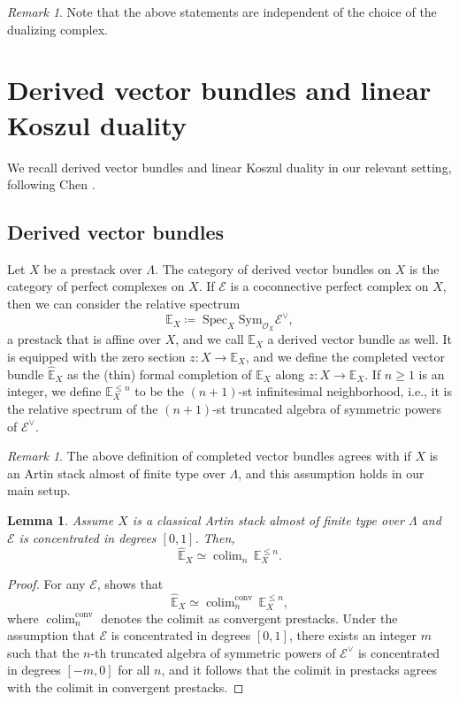 \documentclass{amsart}
\newtheorem{lemma}[theorem]{Lemma}
\theoremstyle{definition}
\theoremstyle{remark}
\newtheorem{remark}[theorem]{Remark}
\numberwithin{equation}{section}
\DeclareMathOperator{\Spec}{Spec}
\DeclareMathOperator{\colim}{colim}
\begin{document}
\begin{remark}
Note that the above statements are independent of the choice of the dualizing complex. 
\end{remark}

\section{Derived vector bundles and linear Koszul duality}

We recall derived vector bundles and linear Koszul duality in our relevant setting, following Chen \cite{Chen2023categorical}. 

\subsection{Derived vector bundles}
Let $X$ be a prestack over $\Lambda$. The category of derived vector bundles on $X$ is the category of perfect complexes on $X$. If $\mathcal{E}$ is a coconnective perfect complex on $X$, then we can consider the relative spectrum
\[
\mathbb{E}_X\coloneq \Spec_X \mathrm{Sym}_{\mathcal{O}_X} \mathcal{E}^\vee,
\]
a prestack that is affine over $X$, and we call $\mathbb{E}_X$ a derived vector bundle as well. It is equipped with the zero section $z\colon X\to \mathbb{E}_X$, and we define the completed vector bundle $\widehat{\mathbb{E}}_X$ as the (thin) formal completion of $\mathbb{E}_X$ along $z\colon X\to \mathbb{E}_X$. If $n\geq 1$ is an integer, we define $\mathbb{E}^{\leq n}_X$ to be the $(n+1)$-st infinitesimal neighborhood, i.e., it is the relative spectrum of the $(n+1)$-st truncated algebra of symmetric powers of $\mathcal{E}^\vee$. 

\begin{remark}
The above definition of completed vector bundles agrees with \cite[Definition 7.1.24]{ElmantoKubrakSosnilo} if $X$ is an Artin stack almost of finite type over $\Lambda$, and this assumption holds in our main setup.  
\end{remark}

\begin{lemma}\label{lem:colimit=convergent colimit}
Assume $X$ is a classical Artin stack almost of finite type over $\Lambda$ and $\mathcal{E}$ is concentrated in degrees $[0,1]$. Then, 
\[
\widehat{\mathbb{E}}_X \simeq \colim_n \, \mathbb{E}_X^{\leq n}. 
\]
\end{lemma}

\begin{proof}
For any $\mathcal{E}$, \cite[Proposition A.1.1]{ElmantoKubrakSosnilo} shows that 
\[
\widehat{\mathbb{E}}_X \simeq \colim_n^{\mathrm{conv}} \, \mathbb{E}_X^{\leq n},  
\]
where $\colim_n^{\mathrm{conv}}$ denotes the colimit as convergent prestacks. Under the assumption that $\mathcal{E}$ is concentrated in degrees $[0, 1]$, there exists an integer $m$ such that the $n$-th truncated algebra of symmetric powers of $\mathcal{E}^{\vee}$ is concentrated in degrees $[-m,0]$ for all $n$, and it follows that the colimit in prestacks agrees with the colimit in convergent prestacks. 
\end{proof}
\end{document}
